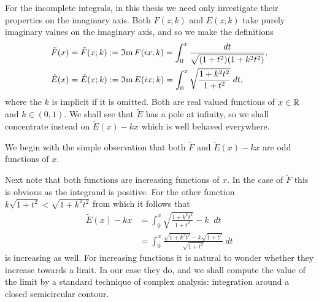 For the incomplete integrals, in this thesis we need only investigate their properties on the imaginary axis. Both $F(z;k)$ and $E(z;k)$ take purely imaginary values on the imaginary axis, and so we make the definitions
\begin{align}
\tilde F(x) &= \tilde F (x ; k) := \mathfrak{I}\text{m}\, F(i x; k)
= \int_0^x \frac{dt}{\sqrt{(1+t^2)(1+k^2 t^2)}}, \\
\tilde E(x) &= \tilde E (x ; k) := \mathfrak{I}\text{m}\, E(i x; k)
= \int_0^x \sqrt{\frac{1+k^2t^2}{1+t^2}}\;dt,
\end{align}
where the $k$ is implicit if it is omitted. Both are real valued functions of $x \in \mathbb{R}$ and $k\in (0,1)$. We shall see that $\tilde{E}$ has a pole at infinity, so we shall concentrate instead on $\tilde{E}(x) - k x$ which is well behaved everywhere.

We begin with the simple observation that both $\tilde{F}$ and $\tilde{E}(x) - kx$ are odd functions of $x$.

Next note that both functions are increasing functions of $x$. In the case of $\tilde{F}$ this is obvious as the integrand is positive. For the other function $k \sqrt{1 + t^2} < \sqrt{1 + k^2t^2}$ from which it follows that
\begin{align*}
\tilde{E}(x) - k x
&= \int_0^x \sqrt{\frac{1+k^2t^2}{1+t^2}} - k \;\;dt\\
&= \int_0^x \frac{\sqrt{1+k^2t^2} - k\sqrt{1+t^2}}{\sqrt{1+t^2}}\;dt
\end{align*}
is increasing as well. For increasing functions it is natural to wonder whether they increase towards a limit. In our case they do, and we shall compute the value of the limit by a standard technique of complex analysis: integration around a closed semicircular contour.

